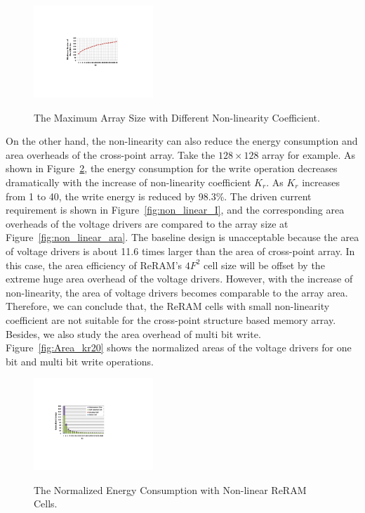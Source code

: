 \begin{figure}%
\centering
  \includegraphics[width=0.4\textwidth]{./figures/non_linear}\\
  \caption{The Maximum Array Size with Different Non-linearity Coefficient.}\label{fig:non_linear}
\end{figure}

On the other hand, the non-linearity can also reduce the energy consumption and area overheads of the cross-point array. Take the $128 \times 128$ array for example. As shown in Figure~\ref{fig:non_linear_energy}, the energy consumption for the write operation decreases dramatically with the increase of non-linearity coefficient $K_r$. As $K_r$ increases from 1 to 40, the write energy is reduced by 98.3\%. The driven current requirement is shown in Figure~\ref{fig:non_linear_I}, and the corresponding area overheads of the voltage drivers are compared to the array size at Figure~\ref{fig:non_linear_ara}. The baseline design is unacceptable because the area of voltage drivers is about 11.6 times larger than the area of cross-point array. In this case, the area efficiency of ReRAM's $4F^2$ cell size will be offset by the extreme huge area overhead of the voltage drivers. However, with the increase of non-linearity, the area of voltage drivers becomes comparable to the array area. Therefore, we can conclude that, the ReRAM cells with small non-linearity coefficient are not suitable for the cross-point structure based memory array. Besides, we also study the area overhead of multi bit write. Figure~\ref{fig:Area_kr20} shows the normalized areas of the voltage drivers for one bit and multi bit write operations. 



\begin{figure}%
\centering
  \includegraphics[width=0.4\textwidth]{./figures/non_linear_energy.pdf}\\
  \caption{The Normalized Energy Consumption with Non-linear ReRAM Cells.}\label{fig:non_linear_energy}
\end{figure}

